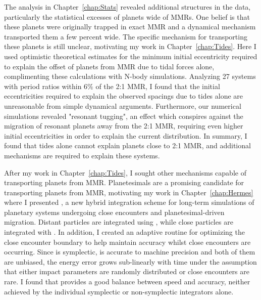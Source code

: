 The analysis in Chapter~\ref{chap:Stats} revealed additional structures in the \kep data, particularly the statistical excesses of planets wide of MMRs.
One belief is that these planets were originally trapped in exact MMR and a dynamical mechanism transported them a few percent wide.
The specific mechanism for transporting these planets is still unclear, motivating my work in Chapter~\ref{chap:Tides}.
Here I used optimistic theoretical estimates for the minimum initial eccentricity required to explain the offset of \kep planets from MMR due to tidal forces alone, complimenting these calculations with N-body simulations.
Analyzing 27 \kep systems with period ratios within $6\%$ of the 2:1 MMR, I found that the initial eccentricities required to explain the observed spacings due to tides alone are unreasonable from simple dynamical arguments.
Furthermore, our numerical simulations revealed "resonant tugging", an effect which conspires against the migration of resonant planets away from the 2:1 MMR, requiring even higher initial eccentricities in order to explain the current \kep distribution. 
In summary, I found that tides alone cannot explain planets close to 2:1 MMR, and additional mechanisms are required to explain these systems. 

After my work in Chapter~\ref{chap:Tides}, I sought other mechanisms capable of transporting planets from MMR. 
Planetesimals are a promising candidate for transporting planets from MMR, motivating my work in Chapter~\ref{chap:Hermes} where I presented \hermes, a new hybrid integration scheme for long-term simulations of planetary systems undergoing close encounters and planetesimal-driven migration. 
Distant particles are integrated using \whfast, while close particles are integrated with \ias.
In addition, I created an adaptive routine for optimizing the close encounter boundary to help maintain accuracy whilst close encounters are occurring.
Since \whfast is symplectic, \ias is accurate to machine precision and both of them are unbiased, the energy error grows sub-linearly with time under the assumption that either impact parameters are randomly distributed or close encounters are rare.
I found that \hermes provides a good balance between speed and accuracy, neither achieved by the individual symplectic or non-symplectic integrators alone.

